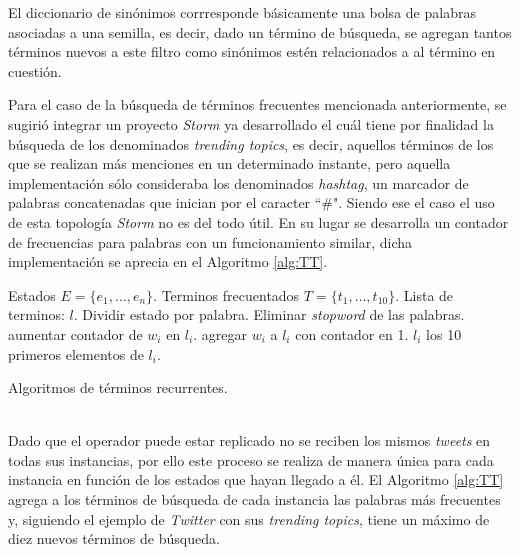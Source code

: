 El diccionario de sinónimos corrresponde básicamente una bolsa de palabras asociadas a una semilla, es decir, dado un término de búsqueda, se agregan tantos términos nuevos a este filtro como sinónimos estén relacionados a al término en cuestión.

Para el caso de la búsqueda de términos frecuentes mencionada anteriormente, se sugirió integrar un proyecto \textit{Storm} ya desarrollado el cuál tiene por finalidad la búsqueda de los denominados \textit{trending topics}, es decir, aquellos términos de los que se realizan más menciones en un determinado instante, pero aquella implementación sólo consideraba los denominados \textit{hashtag}, un marcador de palabras concatenadas que inician por el caracter ``\#". Siendo ese el caso el uso de esta topología \textit{Storm} no es del todo útil. En su lugar se desarrolla un contador de frecuencias para palabras con un funcionamiento similar, dicha implementación se aprecia en el Algoritmo \ref{alg:TT}.\\

\begin{algorithm}[H]
	\begin{algorithmic}
		\REQUIRE Estados $E=\{e_{1}, \dots, e_{n} \}$.
		\ENSURE Terminos frecuentados $T=\{t_{1}, \dots, t_{10} \}$.
		\STATE Lista de terminos: $l$.
			\STATE Dividir estado por palabra.
			\STATE Eliminar \textit{stopword} de las palabras.
					\STATE aumentar contador de $w_{i}$ en $l_{i}$.
				\ELSE
					\STATE agregar $w_{i}$ a $l_{i}$ con contador en 1.
				\ENDIF		
			\ENDFOR
		\ENDFOR
			\RETURN $l_{i}$
		\ELSE
			\RETURN los 10 primeros elementos de $l_{i}$.
		\ENDIF
	\end{algorithmic}
	\caption{Algoritmos de términos recurrentes.}
	\label{alg:TT}
\end{algorithm}\vphantom\\

Dado que el operador puede estar replicado no se reciben los mismos \textit{tweets} en todas sus instancias, por ello este proceso se realiza de manera única para cada instancia en función de los estados que hayan llegado a él. El Algoritmo \ref{alg:TT} agrega a los términos de búsqueda de cada instancia las palabras más frecuentes y, siguiendo el ejemplo de \textit{Twitter} con sus \textit{trending topics}, tiene un máximo de diez nuevos términos de búsqueda.

